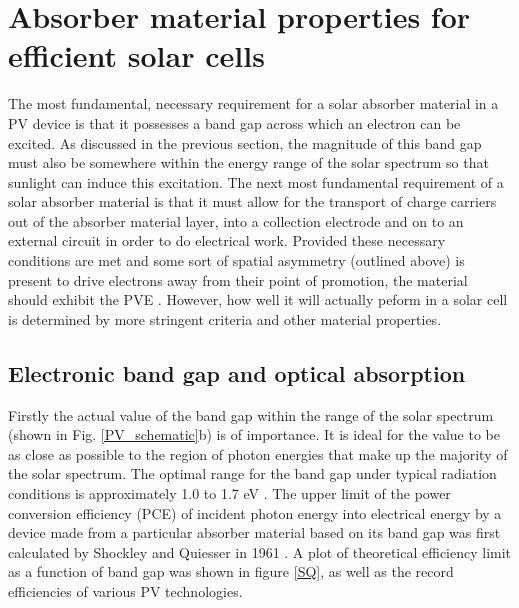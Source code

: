 \documentclass[11pt, twoside]{report}
\begin{document}
\section{Absorber material properties for efficient solar cells}\label{PV_properties}
The most fundamental, necessary requirement for a solar absorber material in a PV device is that it possesses a band gap across which an electron can be excited. As discussed in the previous section, the magnitude of this band gap must also be somewhere within the energy range of the solar spectrum so that sunlight can induce this excitation. The next most fundamental requirement of a solar absorber material is that it must allow for the transport of charge carriers out of the absorber material layer, into a collection electrode and on to an external circuit in order to do electrical work. Provided these necessary conditions are met and some sort of spatial asymmetry (outlined above) is present to drive electrons away from their point of promotion, the material should exhibit the PVE \cite{Nelson2}. However, how well it will actually peform in a solar cell is determined by more stringent criteria and other material properties. 

\subsection{Electronic band gap and optical absorption}

Firstly the actual value of the band gap within the range of the solar spectrum (shown in Fig. \ref{PV_schematic}b) is of importance. It is ideal for the value to be as close as possible to the region of photon energies that make up the majority of the solar spectrum. The optimal range for the band gap under typical radiation conditions is approximately 1.0 to 1.7 eV \cite{PV_E_range}. The upper limit of the power conversion efficiency (PCE) of incident photon energy into electrical energy by a device made from a particular absorber material based on its band gap was first calculated by Shockley and Quiesser in 1961 \cite{SQ_1961}. A plot of theoretical efficiency limit as a function of band gap was shown in figure \ref{SQ}, as well as the record efficiencies of various PV technologies.
\end{document}
